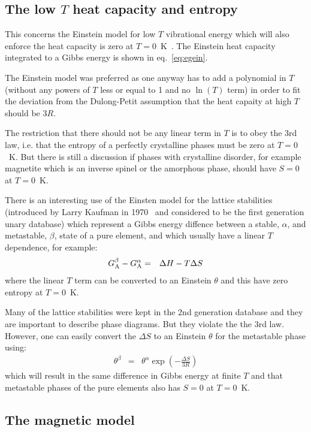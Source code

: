 \documentclass[12pt]{article}
\begin{document}
\begin{appendices}
\subsection{The low $T$ heat capacity and entropy}

This concerns the Einstein model for low $T$ vibrational energy which
will also enforce the heat capacity is zero at $T=0$~K~\cite{01Chen}.
The Einstein heat capacity integrated to a Gibbs energy is shown in
eq.~\ref{eq:egein}.

The Einstein model was preferred as one anyway has to add a polynomial
in $T$ (without any powers of $T$ less or equal to 1 and no $\ln(T)$
term) in order to fit the deviation from the Dulong-Petit assumption
that the heat capaity at high $T$ should be $3R$.

The restriction that there should not be any linear term in $T$ is to
obey the 3rd law, i.e. that the entropy of a perfectly crystalline
phases must be zero at $T=0$~K.  But there is still a discussion if
phases with crystalline disorder, for example magnetite which is an
inverse spinel or the amorphous phase, should have $S=0$ at $T=0$~K.

There is an interesting use of the Einsten model for the lattice
stabilities (introduced by Larry Kaufman in 1970~\cite{70Kau} and
considered to be the first generation unary database) which represent
a Gibbs energy diffence between a stable, $\alpha$, and metastable,
$\beta$, state of a pure element, and which usually have a linear $T$
dependence, for example:
\begin{eqnarray}
  G^{\beta}_{\rm A} - G^{\alpha}_{\rm A} &=& \Delta H -T\Delta S
\end{eqnarray}
where the linear $T$ term can be converted to an Einstein $\theta$
and this have zero entropy at $T=0$~K.

Many of the lattice stabilities were kept in the 2nd generation
database and they are important to describe phase diagrams.  But they
violate the the 3rd law.  However, one can easily convert the $\Delta
S$ to an Einstein $\theta$ for the metastable phase using:
\begin{eqnarray}
  \theta^{\beta} &=& \theta^{\alpha}\exp(-\frac{\Delta S}{3R})
\end{eqnarray}
which will result in the same difference in Gibbs energy at finite $T$
and that metastable phases of the pure elements also has $S=0$ at
$T=0$~K.

\subsection{The magnetic model}


\end{appendices}
\end{document}
